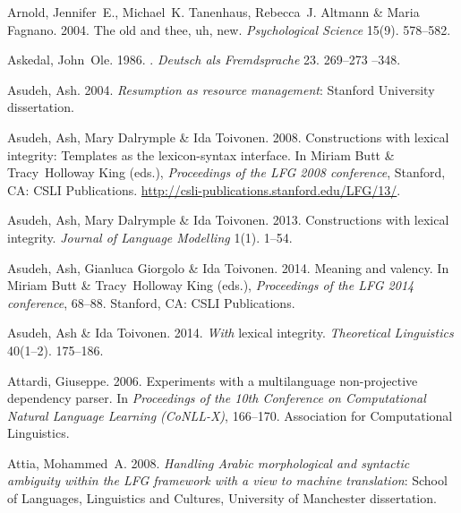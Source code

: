 \begin{thebibliography}{1420}
Arnold, Jennifer~E., Michael~K. Tanenhaus, Rebecca~J. Altmann \& Maria Fagnano.
  2004.
\newblock The old and thee, uh, new.
\newblock \emph{Psychological Science} 15(9). 578--582.

Askedal, John~Ole. 1986.
.
\newblock \emph{Deutsch als Fremdsprache} 23. 269--273 --348.

Asudeh, Ash. 2004.
\newblock \emph{Resumption as resource management}: Stanford University
  dissertation.

Asudeh, Ash, Mary Dalrymple \& Ida Toivonen. 2008.
\newblock Constructions with lexical integrity: {Templates} as the
  lexicon-syntax interface.
\newblock In Miriam Butt \& Tracy~Holloway King (eds.), \emph{Proceedings of
  the {LFG 2008} conference}, Stanford, CA: CSLI Publications.
\newblock \urlprefix\url{http://csli-publications.stanford.edu/LFG/13/}.

Asudeh, Ash, Mary Dalrymple \& Ida Toivonen. 2013.
\newblock Constructions with lexical integrity.
\newblock \emph{Journal of Language Modelling} 1(1). 1--54.

Asudeh, Ash, Gianluca Giorgolo \& Ida Toivonen. 2014.
\newblock Meaning and valency.
\newblock In Miriam Butt \& Tracy~Holloway King (eds.), \emph{Proceedings of
  the {LFG 2014} conference}, 68--88. Stanford, CA: CSLI Publications.

Asudeh, Ash \& Ida Toivonen. 2014.
\newblock \emph{With} lexical integrity.
\newblock \emph{Theoretical Linguistics} 40(1--2). 175--186.

Attardi, Giuseppe. 2006.
\newblock Experiments with a multilanguage non-projective dependency parser.
\newblock In \emph{Proceedings of the {10th Conference on Computational Natural
  Language Learning (CoNLL-X)}}, 166--170. Association for Computational
  Linguistics.

Attia, Mohammed~A. 2008.
\newblock \emph{Handling {Arabic} morphological and syntactic ambiguity within
  the {LFG} framework with a view to machine translation}: School of Languages,
  Linguistics and Cultures, University of Manchester dissertation.


\end{thebibliography}
